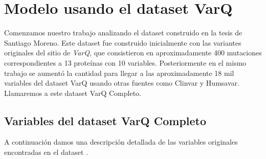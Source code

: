 \section{Modelo usando el dataset VarQ}

Comenzamos nuestro trabajo analizando el dataset construido en la tesis de Santiago Moreno. Este dataset fue construido inicialmente con las variantes originales del sitio de \textit{VarQ}, que consistieron en aproximadamente 400 mutaciones correspondientes a 13 proteínas con 10 variables. Posteriormente en el mismo trabajo se aumentó la cantidad para llegar a las aproximadamente 18 mil variables del dataset VarQ usando otras fuentes como Clinvar y Humsavar. Llamaremos a este dataset VarQ Completo. 

\subsection{Variables del dataset VarQ Completo}

A continuación damos una descripción detallada de las variables originales encontradas en el dataset . 

